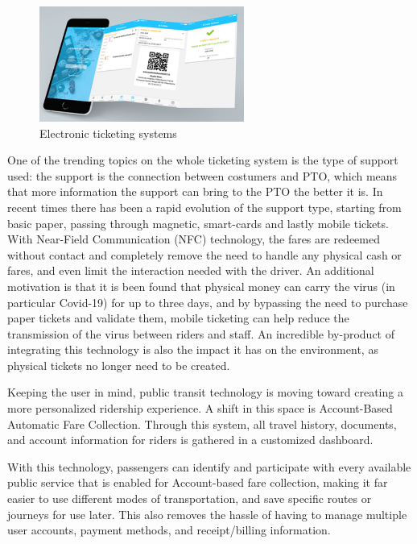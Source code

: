 \begin{figure}[h!]
    \centering
    \includegraphics[width=0.6\textwidth]{Images/New Technologies/ELECTRONIC TICKET.png}
    \caption{Electronic ticketing systems}
    \label{fig:ets}
\end{figure}

One of the trending topics on the whole ticketing system is the type of support used: the support is the connection between costumers and PTO, which means that more information the support can bring to the PTO the better it is. In recent times there has been a rapid evolution of the support type, starting from basic paper, passing through magnetic, smart-cards and lastly mobile tickets. With Near-Field Communication (NFC) technology, the fares are redeemed without contact and completely remove the need to handle any physical cash or fares, and even limit the interaction needed with the driver. An additional motivation is that it is been found that physical money can carry the virus (in particular Covid-19) for up to three days, and by bypassing the need to purchase paper tickets and validate them, mobile ticketing can help reduce the transmission of the virus between riders and staff. An incredible by-product of integrating this technology is also the impact it has on the environment, as physical tickets no longer need to be created.

Keeping the user in mind, public transit technology is moving toward creating a more personalized ridership experience. A shift in this space is Account-Based Automatic Fare Collection. Through this system, all travel history, documents, and account information for riders is gathered in a customized dashboard.

With this technology, passengers can identify and participate with every available public service that is enabled for Account-based fare collection, making it far easier to use different modes of transportation, and save specific routes or journeys for use later. This also removes the hassle of having to manage multiple user accounts, payment methods, and receipt/billing information.

